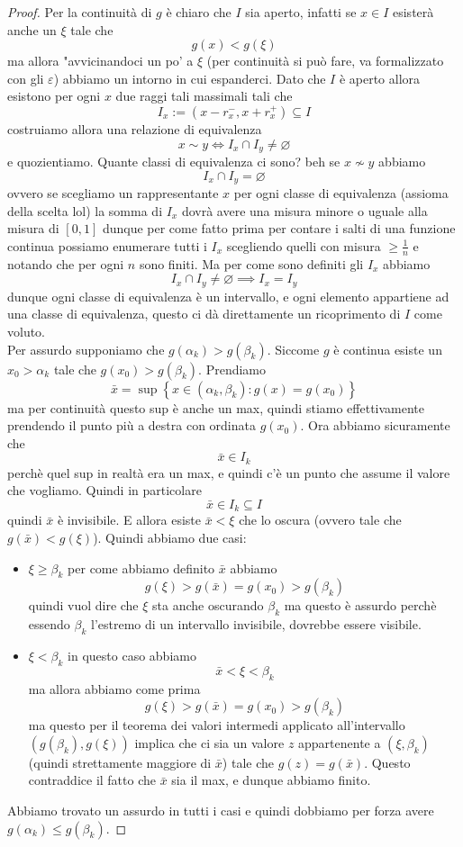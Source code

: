 \documentclass[11pt]{scrartcl}
\newcommand{\eset}{\varnothing}
\begin{document}
	 \begin{proof}
	 	Per la continuità di $g$ è chiaro che $I$ sia aperto, infatti se $x\in I$ esisterà anche un $\xi$ tale che
	 	$$g(x)<g(\xi)$$
	 	ma allora "avvicinandoci un po' a $\xi$ (per continuità si può fare, va formalizzato con gli $\varepsilon$) abbiamo un intorno in cui espanderci. Dato che $I$ è aperto allora esistono per ogni $x$ due raggi tali massimali tali che 
	 	$$I_x:=(x-r^-_x,x+r^+_x)\subseteq I$$
	 	costruiamo allora una relazione di equivalenza 
	 	$$x\sim y \iff I_x\cap I_y\ne \eset$$
	 	e quozientiamo. Quante classi di equivalenza ci sono? beh se $x\not\sim y$ abbiamo
	 	$$I_x\cap I_y=\eset$$
	 	ovvero se scegliamo un rappresentante $x$ per ogni classe di equivalenza (assioma della scelta lol) la somma di $I_x$ dovrà avere una misura minore o uguale alla misura di $[0,1]$ dunque per come fatto prima per contare i salti di una funzione continua possiamo enumerare tutti i $I_x$ scegliendo quelli con misura $\ge \frac{1}{n}$  e notando che per ogni $n$ sono finiti. Ma per come sono definiti gli $I_x$ abbiamo
	 	$$I_x\cap I_y\ne \eset \implies I_x=I_y$$
	 	dunque ogni classe di equivalenza è un intervallo, e ogni elemento appartiene ad una classe di equivalenza, questo ci dà direttamente un ricoprimento di $I$ come voluto. \\
	 	Per assurdo supponiamo che $g(\alpha_k)>g(\beta_k)$. Siccome $g$ è continua esiste un $x_0>\alpha_k$ tale che $g(x_0)>g(\beta_k)$. Prendiamo
	 	$$\bar{x}=\sup\left\{x\in (\alpha_k,\beta_k):g(x)=g(x_0)\right\}$$
	 	ma per continuità questo sup è anche un max, quindi stiamo effettivamente prendendo il punto più a destra con ordinata $g(x_0)$. Ora abbiamo sicuramente che 
	 	$$\bar{x}\in I_k$$
	 	perchè quel sup in realtà era un max, e quindi c'è un punto che assume il valore che vogliamo. Quindi in particolare 
	 	$$\bar{x}\in I_k\subseteq I$$
	 	quindi $\bar{x}$ è invisibile. E allora esiste $\bar{x}<\xi$ che lo oscura (ovvero tale che $g(\bar{x})<g(\xi)$). Quindi abbiamo due casi:
	 	\begin{itemize}
	 		\item $\xi\ge \beta_k$ per come abbiamo definito $\bar{x}$ abbiamo
	 		$$g(\xi)>g(\bar{x})=g(x_0)>g(\beta_k)$$
	 		quindi vuol dire che $\xi$ sta anche oscurando $\beta_k$ ma questo è assurdo perchè essendo $\beta_k$ l'estremo di un intervallo invisibile, dovrebbe essere visibile.
	 		\item $\xi < \beta_k$ in questo caso abbiamo
	 		$$\bar{x}<\xi<\beta_k$$
	 		ma allora abbiamo come prima 
	 		$$g(\xi)>g(\bar{x})=g(x_0)>g(\beta_k)$$
	 		ma questo per il teorema dei valori intermedi applicato all'intervallo $(g(\beta_k),g(\xi))$ implica che ci sia un valore $z$ appartenente a $(\xi,\beta_k)$ (quindi strettamente maggiore di $\bar{x}$) tale che $g(z)=g(\bar{x})$. Questo contraddice il fatto che $\bar{x}$ sia il max, e dunque abbiamo finito.
	 	\end{itemize}
	 	Abbiamo trovato un assurdo in tutti i casi e quindi dobbiamo per forza avere $g(\alpha_k)\le g(\beta_k)$.
	 \end{proof}
\end{document}
